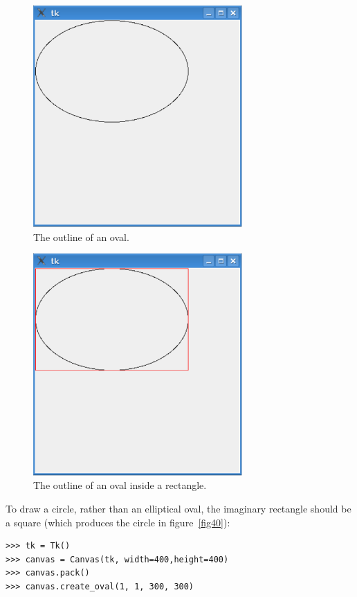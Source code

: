 \begin{figure}
\begin{center}
\includegraphics[width=80mm]{images/figure38}
\end{center}
\caption{The outline of an oval.}\label{fig38}
\end{figure}

\begin{figure}
\begin{center}
\includegraphics[width=80mm]{images/figure39}
\end{center}
\caption{The outline of an oval inside a rectangle.}\label{fig39}
\end{figure}

\noindent
To draw a circle, rather than an elliptical oval, the imaginary rectangle should be a square (which produces the circle in figure~\ref{fig40}):

\begin{Verbatim}[frame=single]
>>> tk = Tk()
>>> canvas = Canvas(tk, width=400,height=400)
>>> canvas.pack()
>>> canvas.create_oval(1, 1, 300, 300)
\end{Verbatim}


